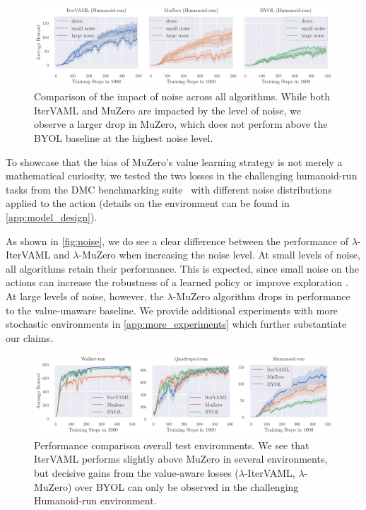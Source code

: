 \begin{figure}[b]
    \centering
    \includegraphics[width=\textwidth]{figures/lambda/noise.pdf}
    \caption{Comparison of the impact of noise across all algorithms. While both IterVAML and MuZero are impacted by the level of noise, we observe a larger drop in MuZero, which does not perform above the BYOL baseline at the highest noise level.}
    \label{fig:noise}
\end{figure}

To showcase that the bias of MuZero's value learning strategy is not merely a mathematical curiosity, we tested the two losses in the challenging humanoid-run tasks from the DMC benchmarking suite~\parencite{tunyasuvunakool2020} with different noise distributions applied to the action (details on the environment can be found in \autoref{app:model_design}).


As shown in \autoref{fig:noise}, we do see a clear difference between the performance of $\lambda$-IterVAML and $\lambda$-MuZero when increasing the noise level.
At small levels of noise, all algorithms retain their performance.
This is expected, since small noise on the actions can increase the robustness of a learned policy or improve exploration \parencite{hollenstein2022action}.
At large levels of noise, however, the $\lambda$-MuZero algorithm drops in performance to the value-unaware baseline.
We provide additional experiments with more stochastic environments in \autoref{app:more_experiments} which further substantiate our claims.

\begin{figure}[b]
    \centering
    \includegraphics[width=\textwidth]{figures/lambda/full.pdf}
    \caption{Performance comparison overall test environments. We see that IterVAML performs slightly above MuZero in several environments, but decisive gains from the value-aware losses ($\lambda$-IterVAML, $\lambda$-MuZero) over BYOL can only be observed in the challenging Humanoid-run environment.}
    \label{fig:full}
\end{figure}

